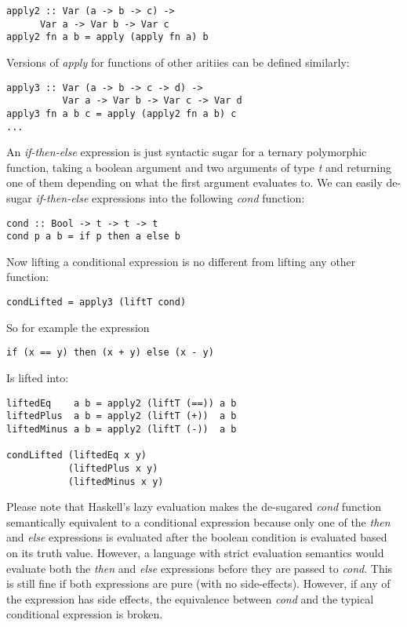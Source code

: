 \documentclass[10pt,conference]{IEEEtran}
\begin{document}
\begin{exmp}
\begin{verbatim}
apply2 :: Var (a -> b -> c) -> 
	  Var a -> Var b -> Var c
apply2 fn a b = apply (apply fn a) b
\end{verbatim}

Versions of \emph{apply} for functions of other aritiies  can be defined similarly:

\begin{verbatim}
apply3 :: Var (a -> b -> c -> d) -> 
          Var a -> Var b -> Var c -> Var d
apply3 fn a b c = apply (apply2 fn a b) c
...
\end{verbatim}

\end{exmp}

\begin{exmp}

An \emph{if-then-else} expression is just syntactic sugar for a ternary polymorphic function, taking a boolean argument and two arguments of type \emph{t} and returning one of them depending on what the first argument evaluates to. We can easily de-sugar \emph{if-then-else} expressions into the following \emph{cond} function:

\begin{verbatim}
cond :: Bool -> t -> t -> t
cond p a b = if p then a else b
\end{verbatim}

Now lifting a conditional expression is no different from lifting any other function:

\begin{verbatim}
condLifted = apply3 (liftT cond)
\end{verbatim}

So for example the expression

\begin{verbatim}
if (x == y) then (x + y) else (x - y)
\end{verbatim}

Is lifted into:

\begin{verbatim}
liftedEq    a b = apply2 (liftT (==)) a b
liftedPlus  a b = apply2 (liftT (+))  a b
liftedMinus a b = apply2 (liftT (-))  a b

condLifted (liftedEq x y) 
           (liftedPlus x y) 
           (liftedMinus x y)
\end{verbatim}

Please note that Haskell's lazy evaluation makes the de-sugared \emph{cond} function semantically equivalent to a conditional expression because only one of the \emph{then} and \emph{else} expressions is evaluated after the boolean condition is evaluated based on its truth value. However, a language with strict evaluation semantics would evaluate both the \emph{then} and \emph{else} expressions before they are passed to \emph{cond}. This is still fine if both expressions are pure (with no side-effects). However, if any of the expression has side effects, the equivalence between \emph{cond} and the typical conditional expression is broken.

\end{exmp}
\end{document}
